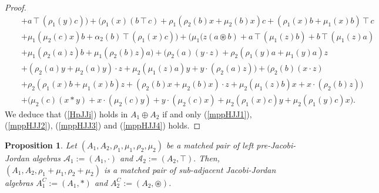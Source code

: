 \documentclass[12pt]{amsart}
\newtheorem{proposition}[Theorem]{Proposition}
\begin{document}
\begin{proof}
\begin{eqnarray}
			&&+a\intercal(\rho_1(y)c)\Big)
			+\Big( \rho_1(x)(b\intercal c)+\rho_1(\rho_2(b)x+\mu_2(b)x)c+(\rho_1(x)b+\mu_1(x)b)\intercal c\nonumber\\
			&&+\mu_1(\mu_2(c)x)b
			+\alpha_2(b)\intercal(\rho_1(x)c)
			\Big)
			+\Big(\mu_1(z(a\circledast b)+a\intercal(\mu_1(z)b)+b\intercal(\mu_1(z)a)\nonumber\\
			&&+\mu_1(\rho_2(a)z)b+\mu_1(\rho_2(b)z)a   \Big)+
			\Big(\rho_2(a)(y\cdot z)+\rho_2(\rho_1(y)a+\mu_1(y)a)z\nonumber\\
			&&+(\rho_2(a)y+\mu_2(a)y)\cdot z+\mu_2(\mu_1(z)a)y+y\cdot(\rho_2(a)z) \Big)+\Big(\rho_2(b)(x\cdot z)\nonumber\\
			&&+\rho_2(\rho_1(x)b+\mu_1(x)b)z+(\rho_2(b)x+\mu_2(b)x)\cdot z+\mu_2(\mu_1(z)b)x+x\cdot(\rho_2(b)z) \Big)\nonumber\\
			&&+\Big(\mu_2(c)(x\ast y)+x\cdot(\mu_2(c)y)+y\cdot(\mu_2(c)x)
			+\mu_2(\rho_1(x)c)y+\mu_2(\rho_1(y)c)x \Big).\nonumber
		\end{eqnarray}
		We deduce that (\ref{HpJJi}) holds in $A_1\oplus A_2$  if and only (\ref{mppHJJ1}), (\ref{mppHJJ2}), (\ref{mppHJJ3}) and (\ref{mppHJJ4}) holds.
	\end{proof}
	\begin{proposition}
		Let $(A_1,A_2,\rho_1,\mu_1,\rho_2,
		\mu_2)$ be a matched pair of left pre-Jacobi-Jordan algebras
		$\mathcal{A}_1:=(A_1,\cdot)$ and $\mathcal{A}_2:=(A_2,\top).$  Then,
		$(A_1, A_2, \rho_1+\mu_1,\rho_2+\mu_2)$ is a matched pair of sub-adjacent Jacobi-Jordan algebras $A_1^C:=(A_1,\ast)$ and $A_2^C:=(A_2,\circledast)$.
	\end{proposition}
\end{document}

